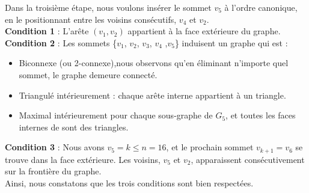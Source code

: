 \documentclass[hidelinks,letterpaper,12pt]{article}
\begin{document}
Dans la troisième étape, nous voulons insérer le sommet $v_5$ à l'ordre canonique, en le positionnant entre les voisins consécutifs, $v_4$ et $v_2$.
\\
\textbf{Condition 1} : L'arête \( (v_1,v_2) \) appartient à la face extérieure du graphe.
\\
\textbf{Condition 2} : Les sommets \{$v_1$, $v_2$, $v_3$, $v_4$ ,$v_5$\} induisent un graphe qui est :
\begin{itemize}
\item Biconnexe (ou 2-connexe),nous observons qu'en éliminant n'importe quel sommet, le graphe demeure connecté.
\item Triangulé intérieurement : chaque arête interne appartient à un triangle.
\item Maximal intérieurement pour chaque sous-graphe de $G_5$, et toutes les faces internes de sont des triangles.
\end{itemize}
\textbf{Condition 3} : Nous avons $v_5=k \leq n=16$, et le prochain sommet $v_{k+1}=v_6$ se trouve dans la face extérieure. Les voisins, $v_5$ et $v_2$, apparaissent consécutivement sur la frontière du graphe.
\\
Ainsi, nous constatons que les trois conditions sont bien respectées.
\end{document}
